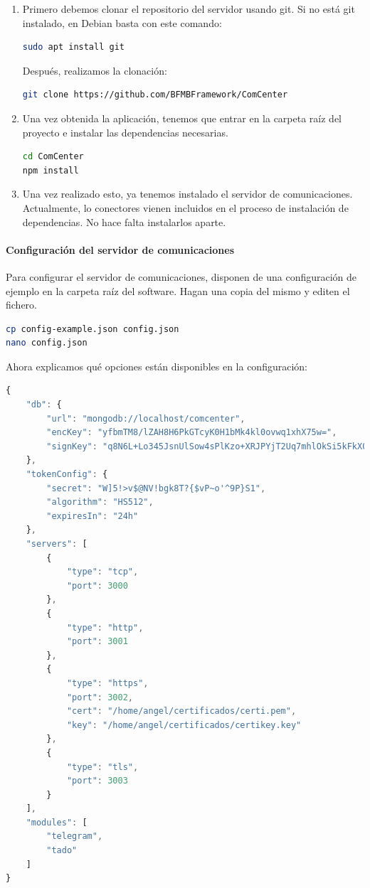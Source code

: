 \documentclass[spanish,12pt, a4paper, twoside]{paper}
\begin{document}
\begin{enumerate}
\item Primero debemos clonar el repositorio del servidor usando git. Si no está git instalado, en Debian basta con este comando:
\begin{lstlisting}[language=sh]
sudo apt install git
\end{lstlisting}

Después, realizamos la clonación:
\begin{lstlisting}[language=sh]
git clone https://github.com/BFMBFramework/ComCenter
\end{lstlisting}

\item Una vez obtenida la aplicación, tenemos que entrar en la carpeta raíz del proyecto e instalar las dependencias necesarias.
\begin{lstlisting}[language=sh]
cd ComCenter
npm install
\end{lstlisting}

\item Una vez realizado esto, ya tenemos instalado el servidor de comunicaciones. Actualmente, lo conectores vienen incluidos en el proceso de instalación de dependencias. No hace falta instalarlos aparte.
\end{enumerate}

\paragraph{Configuración del servidor de comunicaciones}

Para configurar el servidor de comunicaciones, disponen de una configuración de ejemplo en la carpeta raíz del software. Hagan una copia del mismo y editen el fichero.

\begin{lstlisting}[language=sh]
cp config-example.json config.json
nano config.json
\end{lstlisting}

Ahora explicamos qué opciones están disponibles en la configuración:
\begin{lstlisting}[language=Javascript]
{
	"db": {
		"url": "mongodb://localhost/comcenter",
		"encKey": "yfbmTM8/lZAH8H6PkGTcyK0H1bMk4kl0ovwq1xhX75w=",
		"signKey": "q8N6L+Lo345JsnUlSow4sPlKzo+XRJPYjT2Uq7mhlOkSi5kFkX0UoIY3etfm4UxtNHaM8xaX2HtkAhV7Gye0KA=="
	},
	"tokenConfig": {
		"secret": "W]5!>v$@NV!bgk8T?{$vP~o'^9P}S1",
		"algorithm": "HS512",
		"expiresIn": "24h"
	},
	"servers": [
		{
			"type": "tcp",
			"port": 3000
		},
		{
			"type": "http",
			"port": 3001
		},
		{
			"type": "https",
			"port": 3002,
			"cert": "/home/angel/certificados/certi.pem",
			"key": "/home/angel/certificados/certikey.key"
		},
		{
			"type": "tls",
			"port": 3003
		}
	],
	"modules": [
		"telegram",
		"tado"
	]
}
\end{lstlisting}
\end{document}
